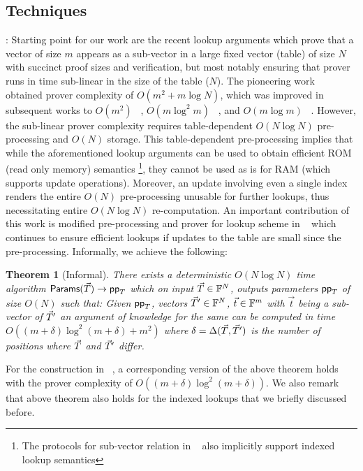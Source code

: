 \documentclass[sigconf]{acmart}
\newtheorem{theorem}{Theorem}[section]
\begin{document}
\subsection{Techniques}\label{subsec:techniques}
: Starting point for our work are the recent lookup arguments which prove that a vector of size $m$ appears as
a sub-vector in a large fixed vector (table) of size $N$ with succinct proof sizes and verification, but most notably
ensuring that prover runs in time sub-linear in the size of the table ($N$). The pioneering work ~\cite{CCS:ZBKMNS22}
obtained prover complexity of $O(m^2+m\log N)$, which was improved in subsequent works to $O(m^2)$ ~\cite{EPRINT:PosKat22},
$O(m\log^2 m)$ ~\cite{EPRINT:ZGKMR22}, and $O(m\log m)$ ~\cite{EPRINT:EagFioGab22}. However, the sub-linear prover
complexity requires table-dependent $O(N\log N)$ pre-processing and $O(N)$ storage. This table-dependent
pre-processing implies that while
the aforementioned lookup arguments can be used to obtain efficient ROM (read only memory) semantics
\footnote{The protocols for sub-vector relation in ~\cite{CCS:ZBKMNS22, EPRINT:ZGKMR22} also implicitly support indexed lookup semantics},
they cannot be used as is for RAM (which supports update operations). Moreover, an update involving even a single
index renders the entire $O(N)$ pre-processing unusable for further lookups, thus necessitating entire $O(N\log N)$
re-computation. An important contribution of this work is modified pre-processing and prover for lookup scheme
in ~\cite{EPRINT:PosKat22} which continues to ensure efficient lookups if updates to the table are small since the pre-processing.
Informally, we achieve the following:

\begin{theorem}[Informal]\label{thm:pre-process}
	There exists a deterministic $O(N\log N)$ time algorithm $\textsf{Params}(\vec{T})\rightarrow \mathsf{pp}_T$
	which on input $\vec{T}\in \mathbb{F}^N$, outputs parameters $\mathsf{pp}_T$ of size $O(N)$ such
	that: Given $\mathsf{pp}_T$, vectors $\vec{T}'\in \mathbb{F}^N$, $\vec{t}\in \mathbb{F}^m$ with $\vec{t}$ being a sub-vector of $\vec{T}'$
	an argument of knowledge for the same can be computed in time
	$O((m+\delta)\log^2 (m+\delta) + m^2)$ where $\delta=\Delta(\vec{T}, \vec{T}')$
	is the number of positions where $\vec{T}$ and $\vec{T}'$ differ.
\end{theorem}
For the construction in ~\cite{EPRINT:EagFioGab22}, a corresponding version of the above theorem holds with the prover complexity
of $O((m+\delta)\log^2(m+\delta))$. We also remark that above theorem also holds for the indexed lookups that we briefly discussed before.\smallskip
\end{document}
